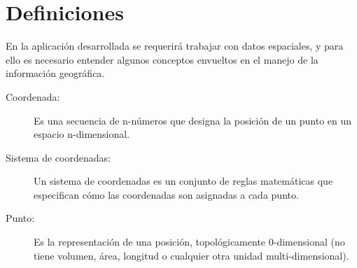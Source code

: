   \section{Definiciones} %
  \label{sec:definiciones}

    En la aplicación desarrollada se requerirá trabajar con datos espaciales, y para ello es necesario entender algunos conceptos envueltos en el manejo de la información geográfica.

    \begin{description}
      \item[Coordenada:] Es una secuencia de n-números que designa la posición de un punto en un espacio n-dimensional.
      \item[Sistema de coordenadas:] Un sistema de coordenadas es  un conjunto de reglas matemáticas que especifican cómo las coordenadas son asignadas  a cada  punto.
      \item[Punto:] Es  la representación de una posición, topológicamente 0-dimensional (no tiene volumen, área, longitud o cualquier otra unidad multi-dimensional).
    \end{description}





